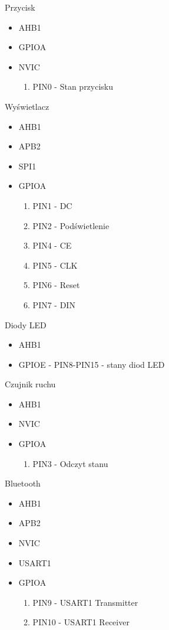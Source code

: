\documentclass{article}
\begin{document}
Przycisk
\begin{itemize}
    \item AHB1
    \item GPIOA
    \item NVIC
    \begin{enumerate}
        \item PIN0 - Stan przycisku
    \end{enumerate}
\end{itemize}

Wyświetlacz
\begin{itemize}
    \item AHB1
    \item APB2
    \item SPI1
    \item GPIOA
        \begin{enumerate}
            \item PIN1 - DC
            \item PIN2 - Podświetlenie
            \item PIN4 - CE
            \item PIN5 - CLK
            \item PIN6 - Reset
            \item PIN7 - DIN
        \end{enumerate}
\end{itemize}

Diody LED
\begin{itemize}
    \item AHB1
    \item GPIOE - PIN8-PIN15 - stany diod LED
\end{itemize}

Czujnik ruchu
\begin{itemize}
    \item AHB1
    \item NVIC
    \item GPIOA
        \begin{enumerate}
            \item PIN3 - Odczyt stanu
        \end{enumerate}
\end{itemize}

Bluetooth
\begin{itemize}
    \item AHB1
    \item APB2
    \item NVIC
    \item USART1
    \item GPIOA
        \begin{enumerate}
            \item PIN9 - USART1 Transmitter
            \item PIN10 - USART1 Receiver
        \end{enumerate}
\end{itemize}
\end{document}
